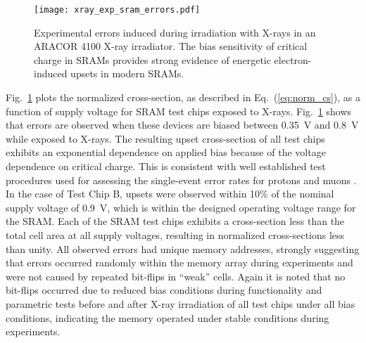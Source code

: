 \begin{figure}[tb]
    \centering
        \texttt{[image: xray\_exp\_sram\_errors.pdf]}
    \caption{Experimental errors induced during irradiation with X-rays in an ARACOR 4100 X-ray irradiator. The bias sensitivity of critical charge in SRAMs provides strong evidence of energetic electron-induced upsets in modern SRAMs.}
    \label{fig:xray_exp_seus}
\end{figure}
Fig.~\ref{fig:xray_exp_seus} plots the normalized cross-section, as described in Eq.~(\ref{eq:norm_cs}), as a function of supply voltage for SRAM test chips exposed to X-rays.
Fig.~\ref{fig:xray_exp_seus} shows that errors are observed when these devices are biased between 0.35~V and 0.8~V while exposed to X-rays. 
The resulting upset cross-section of all test chips exhibits an exponential dependence on applied bias because of the voltage dependence on critical charge. 
This is consistent with well established test procedures used for assessing the single-event error rates for protons and muons \cite{Rodbell:2007vl, Sierawski:2010cj}. 
In the case of Test Chip B, upsets were observed within 10\% of the nominal supply voltage of 0.9~V, which is within the designed operating voltage range for the SRAM. 
Each of the SRAM test chips exhibits a cross-section less than the total cell area at all supply voltages, resulting in normalized cross-sections less than unity.
All observed errors had unique memory addresses, strongly suggesting that errors occurred randomly within the memory array during experiments and were not caused by repeated bit-flips in ``weak'' cells.
Again it is noted that no bit-flips occurred due to reduced bias conditions during functionality and parametric tests before and after X-ray irradiation of all test chips under all bias conditions, indicating the memory operated under stable conditions during experiments.

